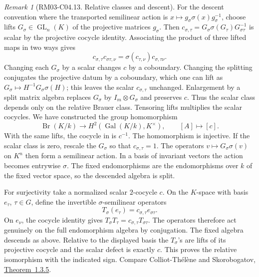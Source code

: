 \documentclass[11pt,oneside,openany]{book}
\theoremstyle{definition}
\theoremstyle{remark}
\newtheorem{remark}[theorem]{Remark}
\begin{document}
\begin{remark}[RM03-C04.13. Relative classes and descent]
For the descent convention where the transported semilinear
action is \(x\mapsto g_\sigma \sigma(x)g_\sigma^{-1}\),
choose lifts \(G_\sigma\in\operatorname{GL}_n(K)\) of the
projective matrices \(g_\sigma\). Then
\(c_{\sigma,\tau}=G_\sigma\sigma(G_\tau)G_{\sigma\tau}^{-1}\)
is scalar by the projective cocycle identity. Associating the
product of three lifted maps in two ways gives
\[
 c_{\sigma,\tau}c_{\sigma\tau,\nu}
 =\sigma(c_{\tau,\nu})c_{\sigma,\tau\nu}.
\]
Changing each \(G_\sigma\) by a scalar changes \(c\) by a
coboundary. Changing the splitting conjugates the projective
datum by a coboundary, which one can lift as
\(G_\sigma\mapsto H^{-1}G_\sigma\sigma(H)\); this leaves the
scalar \(c_{\sigma,\tau}\) unchanged. Enlargement by a
split matrix algebra replaces \(G_\sigma\) by \(I_m\otimes G_\sigma\)
and preserves \(c\). Thus the scalar class depends only
on the relative Brauer class. Tensoring lifts multiplies
the scalar cocycles. We have constructed the group homomorphism
\[
 \operatorname{Br}(K/k)\longrightarrow
 H^2(\operatorname{Gal}(K/k),K^\times),\qquad [A]\longmapsto[c].
\]
With the same lifts, the cocycle in
\cite[Equation~(59.61.5.1)]{stacksdescent} is \(c^{-1}\).
The homomorphism is injective. If the scalar class is zero,
rescale the \(G_\sigma\) so that \(c_{\sigma,\tau}=1\).
The operators \(v\mapsto G_\sigma\sigma(v)\) on \(K^n\) then
form a semilinear action. In a basis of invariant vectors the
action becomes entrywise \(\sigma\). The fixed endomorphisms
are the endomorphisms over \(k\) of the fixed vector space,
so the descended algebra is split.

For surjectivity take a normalized scalar \(2\)-cocycle \(c\).
On the \(K\)-space with basis \(e_\tau\), \(\tau\in G\), define
the invertible \(\sigma\)-semilinear operators
\[
 T_\sigma(e_\tau)=c_{\sigma,\tau}e_{\sigma\tau}.
\]
On \(e_\nu\), the cocycle identity gives
\(T_\sigma T_\tau=c_{\sigma,\tau}T_{\sigma\tau}\).
The operators therefore act genuinely on the full endomorphism
algebra by conjugation. The fixed algebra descends as above.
Relative to the displayed basis the \(T_\sigma\)'s are lifts
of its projective cocycle and the scalar defect is exactly \(c\).
This proves the relative isomorphism with the indicated sign.
Compare Colliot-Th\'el\`ene and Skorobogatov,
\href{https://www.imo.universite-paris-saclay.fr/~jean-louis.colliot-thelene/BGgroup_book.pdf}{Theorem~1.3.5}.


\end{remark}
\end{document}
